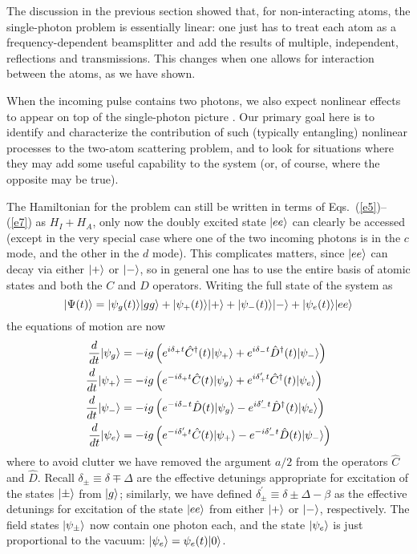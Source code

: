 \documentclass[aps,pra,twocolumn,floatfix,superscriptaddress]{revtex4}
\begin{document}
The discussion in the previous section showed that, for non-interacting atoms, the single-photon problem is essentially linear: one just has to treat each atom as a frequency-dependent beamsplitter and add the results of multiple, independent, reflections and transmissions.  This changes when one allows for interaction between the atoms, as we have shown.

When the incoming pulse contains two photons, we also expect nonlinear effects to appear on top of the single-photon picture \cite{zheng4}.  Our primary goal here is to identify and characterize the contribution of such (typically entangling) nonlinear processes to the two-atom scattering problem, and to look for situations where they may add some useful capability to the system (or, of course, where the opposite may be true). 

The Hamiltonian for the problem can still be written in terms of Eqs.~(\ref{e5})--(\ref{e7}) as $H_I+H_A$, only now the doubly excited state $|ee\rangle$ can clearly be accessed (except in the very special case where one of the two incoming photons is in the $c$ mode, and the other in the $d$ mode).  This complicates matters, since $|ee\rangle$ can decay via either $|+\rangle$ or $|-\rangle$, so in general one has to use the entire basis of atomic states and both the $C$ and $D$ operators.  Writing the full state of the system as 
\begin{equation}
|\Psi(t)\rangle = |\psi_g(t)\rangle|gg\rangle + |\psi_+(t)\rangle|+\rangle+ |\psi_-(t)\rangle|-\rangle+ |\psi_e(t)\rangle|ee\rangle
\label{e26}
\end{equation}
the equations of motion are now
\begin{subequations}
\begin{align}
\frac{d}{dt}|\psi_{g}\rangle &= -ig \left(e^{i\delta_+ t}\hat C^\dagger(t) |\psi_{+}\rangle + e^{i\delta_- t}\hat D^\dagger(t) |\psi_{-}\rangle \right) \label{e27a} \\
\frac{d}{dt}|\psi_{+}\rangle &= -ig \left(e^{-i\delta_+ t}\hat C(t) |\psi_{g}\rangle + e^{i\delta_+^\prime t}\hat C^\dagger(t) |\psi_{e}\rangle \right) \label{e27b} \\
\frac{d}{dt}|\psi_{-}\rangle &= -ig \left(e^{-i\delta_- t}\hat D(t) |\psi_{g}\rangle - e^{i\delta_-^\prime t}\hat D^\dagger(t) |\psi_{e}\rangle \right) \label{e27c} \\
\frac{d}{dt}|\psi_{e}\rangle &= -ig \left(e^{-i\delta_+^\prime t}\hat C(t) |\psi_{+}\rangle - e^{-i\delta_-^\prime t}\hat D(t) |\psi_{-}\rangle \right) \label{e27d}
\end{align} 
\label{e27}
\end{subequations}
where to avoid clutter we have removed the argument $a/2$ from the operators $\hat C$ and $\hat D$.  Recall $\delta_\pm \equiv \delta \mp \Delta $ are the effective detunings appropriate for excitation of the states $|\pm\rangle$ from $|g\rangle$; similarly, we have defined $\delta_\pm^\prime \equiv \delta \pm \Delta - \beta$ as the effective detunings for excitation of the state $|ee\rangle$ from either $|+\rangle$ or $|-\rangle$, respectively. The field states $|\psi_\pm\rangle$ now contain one photon each, and the state $|\psi_e\rangle$ is just proportional to the vacuum: $|\psi_e\rangle = \psi_e(t)|0\rangle$.
\end{document}
